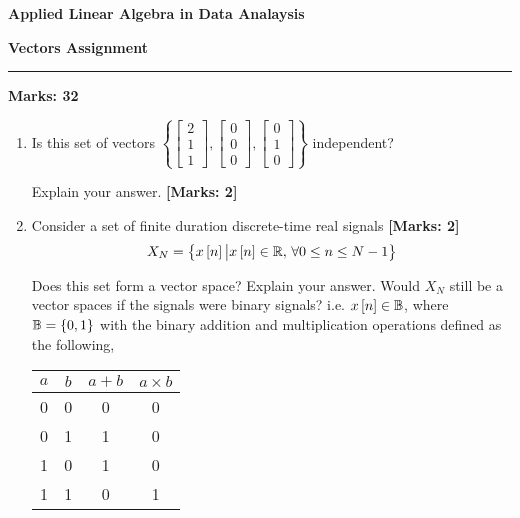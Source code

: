 \documentclass[12pt]{article}
\def\mb{\ensuremath\mathbb}
\def\lc{\ensuremath\left\{}
\def\rc{\ensuremath\right\}}
\def\ls{\ensuremath\left[}
\def\rs{\ensuremath\right]}
\newcommand{\dt}[1]{\ls #1\rs}
\begin{document}
\begin{center}
\begin{large}
\textbf{Applied Linear Algebra in Data Analaysis}\\
\vspace{0.1cm}
\end{large}
\textbf{Vectors Assignment}
\end{center}
\hrule
\vspace{1em}

\begin{large}
    \textbf{Marks: 32}
\end{large}

\begin{enumerate}
    \item Is this set of vectors $\left\{\begin{bmatrix}2 \\ 1 \\ 1\end{bmatrix}, \begin{bmatrix}0 \\ 0\\ 0\end{bmatrix}, \begin{bmatrix}0 \\ 1 \\ 0\end{bmatrix}\right\}$ independent? 
    
    Explain your answer. \textbf{[Marks: 2]}

    \item Consider a set of finite duration discrete-time real signals \textbf{[Marks: 2]}
    \[ X_N = \lc x\dt{n} \big\vert x\dt{n} \in \mb{R}, \,\forall 0 \leq n \leq N-1\rc \]
    
    Does this set form a vector space? Explain your answer. Would $X_N$ still be a vector spaces if the signals were binary signals? i.e. $x\dt{n} \in \mb{B}$, where $\mb{B} = \lc 0, 1\rc$ with the binary addition and multiplication operations defined as the following,

    \begin{center}
        \begin{minipage}[h]{.45\textwidth}
            \centering
            \begin{tabular}{|c|c|c|c|}
                \hline
                $a$ & $b$ & $a+b$ & $a \times b$ \\ \hline
                0 & 0 & 0   & 0     \\ \hline
                0 & 1 & 1   & 0     \\ \hline
                1 & 0 & 1   & 0     \\ \hline
                1 & 1 & 0   & 1     \\ \hline
            \end{tabular}\\
        \end{minipage}
    \end{center}
        

\end{enumerate}
\end{document}
